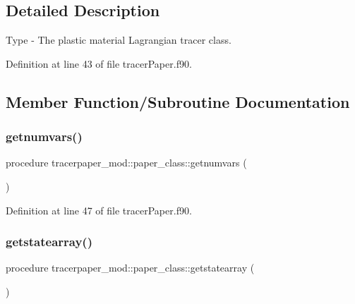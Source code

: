 \subsection{Detailed Description}
Type -\/ The plastic material Lagrangian tracer class. 

Definition at line 43 of file tracer\+Paper.\+f90.



\subsection{Member Function/\+Subroutine Documentation}
\mbox{\label{structtracerpaper__mod_1_1paper__class_a0ba29c27901f4604afa1fbf3c0dc3ca8}} 
\subsubsection{\texorpdfstring{getnumvars()}{getnumvars()}}
{\footnotesize\ttfamily procedure tracerpaper\+\_\+mod\+::paper\+\_\+class\+::getnumvars (\begin{DoxyParamCaption}{ }\end{DoxyParamCaption})\hspace{0.3cm}{\ttfamily [private]}}



Definition at line 47 of file tracer\+Paper.\+f90.

\mbox{\label{structtracerpaper__mod_1_1paper__class_a21d6ed82c83e42c34957d7e7d6013b60}} 
\subsubsection{\texorpdfstring{getstatearray()}{getstatearray()}}
{\footnotesize\ttfamily procedure tracerpaper\+\_\+mod\+::paper\+\_\+class\+::getstatearray (\begin{DoxyParamCaption}{ }\end{DoxyParamCaption})\hspace{0.3cm}{\ttfamily [private]}}



